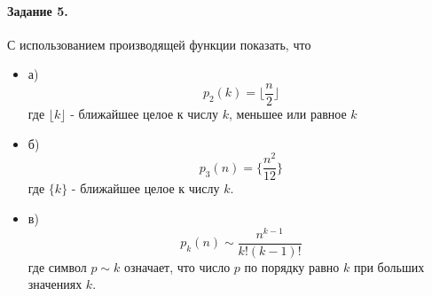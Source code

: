 \documentclass[a4paper,12pt]{article}
\begin{document}
\paragraph{Задание 5.} С использованием производящей функции показать, что
\begin{itemize}
\item а)
\[
	p_2\left(k\right) = \lfloor\frac{n}{2}\rfloor
\]
где $\lfloor k \rfloor$ - ближайшее целое к числу $k$, меньшее или равное $k$

\item б)
\[
	p_3\left(n\right) = \{\frac{n^2}{12}\}
\]
где $\{k\}$ - ближайшее целое к числу $k$.

\item в)
\[
	p_k\left(n\right) \sim \frac{n^{k-1}}{k! \left(k-1\right)!}
\]
где символ $p \sim k$ означает, что число $p$ по порядку равно $k$ при больших значениях $k$.
\end{itemize}
\end{document}

